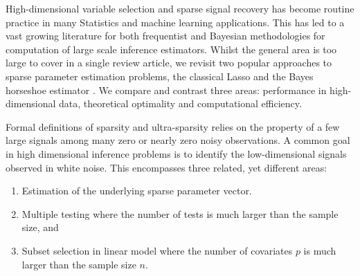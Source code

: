 \documentclass[11pt]{article}
\begin{document}



High-dimensional variable selection and sparse signal recovery has become routine practice in many Statistics and machine learning applications. This has led to a vast growing literature for both frequentist and Bayesian methodologies for computation of large scale inference estimators. Whilst the general area is too large to cover in a single review article, we revisit two popular approaches to sparse parameter estimation problems, the classical Lasso \citep{tibshirani96} and the Bayes horseshoe estimator \citep{carvalho2010horseshoe}. We compare and contrast three areas: performance in high-dimensional data, theoretical optimality and computational efficiency. 

Formal definitions of sparsity and ultra-sparsity relies on the property of a
few large signals among many zero or nearly zero noisy observations. A common
goal in high dimensional inference problems is to identify the low-dimensional
signals observed in white noise. This encompasses three related, yet different
areas: 
\begin{enumerate}
  \item Estimation of the underlying sparse parameter vector. 
  \item Multiple testing where the number of tests is much larger than the sample size, and 
  \item Subset selection in linear model where the number of covariates $p$ is much larger than the sample size $n$. 
\end{enumerate}
\end{document}
